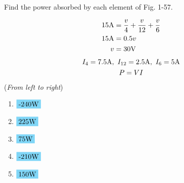 Find the power absorbed by each element of Fig. 1-57.

\begin{align*}
	15\qw{\A} &= \frac{v}{4}+\frac{v}{12}+\frac{v}{6} \\
	15\qw{\A} &= 0.5v \\
	v &= 30\qw{\V}
\end{align*}
\begin{gather*}
	I_4=7.5\qw{\A},\ I_{12}=2.5\qw{\A},\ I_6=5\qw{\A} \\
	P=VI
\end{gather*}
(\emph{From left to right})
\begin{enumerate}[leftmargin=2cm,labelsep=.5cm,label=\bfseries\alph*)]
	\item $
	\begin{aligned}[t]
	\hlbox{-240\qw{\W}}
	\end{aligned} $
	\\[1cm]
	
	\item $
	\begin{aligned}[t]
	\hlbox{225\qw{\W}}
	\end{aligned} $
	\\[1cm]
	
	\item $
	\begin{aligned}[t]
	\hlbox{75\qw{\W}}
	\end{aligned} $
	\\[1cm]
	
	\item $
	\begin{aligned}[t]
	\hlbox{-210\qw{\W}}
	\end{aligned} $
	\\[1cm]
	
	\item $
	\begin{aligned}[t]
	\hlbox{150\qw{\W}}
	\end{aligned} $
	\\[1cm]
\end{enumerate}